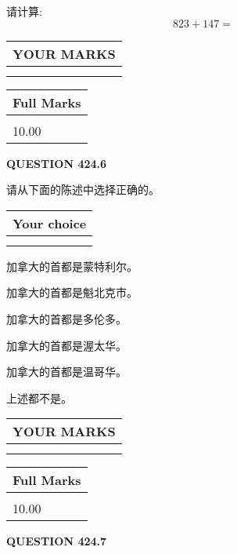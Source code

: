 \documentclass{ctexart}
\begin{document}
  
 
请计算:
\begin{equation}
823 +  %
147 = \nonumber
\end{equation}
 

 

 
  
\vspace{0.2in}
  
\noindent\begin{tabular}{|l|}
\hline
 YOUR MARKS  \\
\hline
 \\ 
 \\ 
\hline
\end{tabular}
\hspace{0.05in} \begin{tabular}{|l|}
\hline
 Full Marks  \\
\hline
 \\ 
10.00 \\
\hline
\end{tabular}
{\textbf{\Large{QUESTION
424.6 
}}}
  
  
请从下面的陈述中选择正确的。
  
  
\noindent\hspace{3.0in} \begin{tabular}{|l|}
\hline
Your choice \\
\hline
 \\ 
 \\ 
\hline
\end{tabular}
  
  
 
 
加拿大的首都是蒙特利尔。
 
 
加拿大的首都是魁北克市。
 
 
加拿大的首都是多伦多。
 
 
加拿大的首都是渥太华。
 
 
加拿大的首都是温哥华。
 
 
 上述都不是。
 
 
  
\vspace{0.2in}
  
\noindent\begin{tabular}{|l|}
\hline
 YOUR MARKS  \\
\hline
 \\ 
 \\ 
\hline
\end{tabular}
\hspace{0.05in} \begin{tabular}{|l|}
\hline
 Full Marks  \\
\hline
 \\ 
10.00 \\
\hline
\end{tabular}
{\textbf{\Large{QUESTION
424.7 
}}}
  
\end{document}
